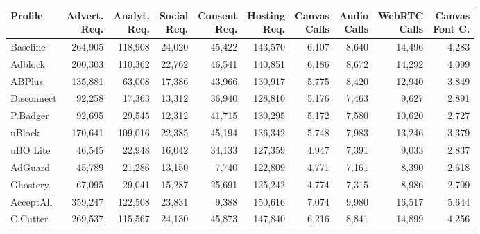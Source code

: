     
    \begin{table}[H]
    \label{tab:tracking-summary}
    \footnotesize
    \begin{tabular}{lrrrrrrrrr}
    \toprule
    \textbf{Profile} & \shortstack{\textbf{\scriptsize Advert.}\\\textbf{Req.}} & \shortstack{\textbf{\scriptsize Analyt.}\\\textbf{Req.}} & \shortstack{\textbf{\scriptsize Social}\\\textbf{Req.}} & \shortstack{\textbf{\scriptsize Consent}\\\textbf{Req.}} & \shortstack{\textbf{\scriptsize Hosting}\\\textbf{Req.}} & \shortstack{\textbf{\scriptsize Canvas}\\\textbf{Calls}} & \shortstack{\textbf{\scriptsize Audio}\\\textbf{Calls}} & \shortstack{\textbf{\scriptsize WebRTC}\\\textbf{Calls}} & \shortstack{\textbf{\scriptsize Canvas}\\\textbf{\scriptsize Font C.}} \\
    \midrule
    Baseline & 264,905 & 118,908 & 24,020 & 45,422 & 143,570 & 6,107 & 8,640 & 14,496 & 4,283 \\
    Adblock & 200,303 & 110,362 & 22,762 & 46,541 & 140,851 & 6,186 & 8,672 & 14,292 & 4,099 \\
    ABPlus & 135,881 & 63,008 & 17,386 & 43,966 & 130,917 & 5,775 & 8,420 & 12,940 & 3,849 \\
    Disconnect & 92,258 & 17,363 & 13,312 & 36,940 & 128,810 & 5,176 & 7,463 & 9,627 & 2,891 \\
    P.Badger & 92,695 & 29,545 & 12,312 & 41,715 & 130,295 & 5,172 & 7,580 & 10,620 & 2,727 \\
    uBlock & 170,641 & 109,016 & 22,385 & 45,194 & 136,342 & 5,748 & 7,983 & 13,246 & 3,379 \\
    uBO Lite & 46,545 & 22,948 & 16,042 & 34,133 & 127,359 & 4,947 & 7,391 & 9,033 & 2,837 \\
    AdGuard & 45,789 & 21,286 & 13,150 & 7,740 & 122,809 & 4,771 & 7,161 & 8,390 & 2,618 \\
    Ghostery & 67,095 & 29,041 & 15,287 & 25,691 & 125,242 & 4,774 & 7,315 & 8,986 & 2,709 \\
    AcceptAll & 359,247 & 122,508 & 23,831 & 9,388 & 150,616 & 7,074 & 9,980 & 16,517 & 5,644 \\
    C.Cutter & 269,537 & 115,567 & 24,130 & 45,873 & 147,840 & 6,216 & 8,841 & 14,899 & 4,256 \\

\end{tabular}
\end{table}
